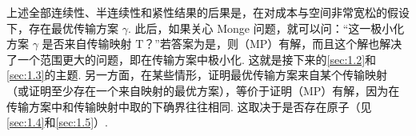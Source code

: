 上述全部连续性、半连续性和紧性结果的后果是，在对成本与空间非常宽松的假设下，存在最优传输方案 $\gamma$. 此后，如果关心 Monge 问题，就可以问：“这一极小化方案 $\gamma$ 是否来自传输映射 $\mathrm{T}$？”若答案为是，则（MP）有解，而且这个解也解决了一个范围更大的问题，即在传输方案中极小化. 这就是接下来的\autoref{sec:1.2}和\autoref{sec:1.3}的主题. 另一方面，在某些情形，证明最优传输方案来自某个传输映射（或证明至少存在一个来自映射的最优方案），等价于证明（MP）有解，因为在传输方案中和传输映射中取的下确界往往相同. 这取决于是否存在原子（见\autoref{sec:1.4}和\autoref{sec:1.5}）.
